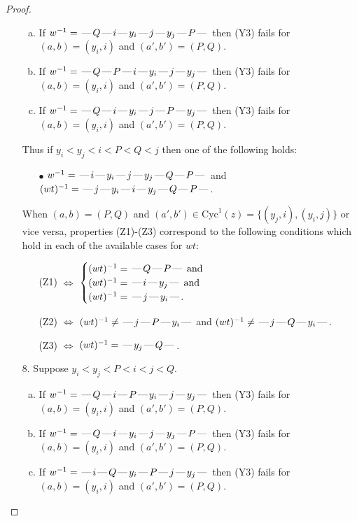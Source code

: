 \documentclass[10pt]{article}
\theoremstyle{definition}
\theoremstyle{definition}
\def\dash{\text{\hspace{0.5mm}---\hspace{0.5mm}}}
\def\Cyc{\mathrm{Cyc}}
\begin{document}
\begin{proof}
\begin{enumerate}
\begin{enumerate}[(a)]
\item If $w^{-1} = \dash Q\dash i\dash y_i\dash j\dash y_j\dash P\dash $ then (Y3) fails for $(a,b)=(y_i,i)$ and $(a',b')=(P,Q)$.
\item If $w^{-1} = \dash Q\dash P\dash i\dash y_i\dash j\dash y_j\dash $ then (Y3) fails for $(a,b)=(y_i,i)$ and $(a',b')=(P,Q)$.
\item If $w^{-1} = \dash Q\dash i\dash y_i\dash j\dash P\dash y_j\dash $ then (Y3) fails for $(a,b)=(y_i,i)$ and $(a',b')=(P,Q)$.
\end{enumerate}
Thus if $y_i < y_j < i < P < Q < j$ then one of the following holds:
\begin{enumerate}
\item[$\bullet$] $w^{-1} = \dash i\dash y_i\dash j\dash y_j\dash Q\dash P\dash $ and $(wt)^{-1} = \dash j\dash y_i\dash i\dash y_j\dash Q\dash P\dash $.
\end{enumerate}
When $(a,b)= (P,Q)$ and $(a',b')\in \Cyc^1(z)=\{(y_j,i),(y_i,j)\}$ or vice versa,
properties (Z1)-(Z3) correspond to the following conditions which
hold in each of the available cases for $wt$:
\begin{enumerate}
\item[](Z1) $\Leftrightarrow$ $\begin{cases}\text{$(wt)^{-1} = \dash Q \dash P \dash$}\text{ and }\\
\text{$(wt)^{-1} = \dash i \dash y_j \dash$}\text{ and }\\
\text{$(wt)^{-1} = \dash j \dash y_i \dash$}.\end{cases}$
\item[](Z2) $\Leftrightarrow$ $(wt)^{-1} \neq \dash j \dash P \dash y_i \dash$ and $(wt)^{-1}\neq \dash j \dash Q \dash y_i \dash$.
\item[](Z3) $\Leftrightarrow$ $(wt)^{-1} = \dash y_j \dash Q \dash$.
\end{enumerate}
\item[$8$.] Suppose $y_i < y_j < P < i < j < Q$.
\begin{enumerate}[(a)]
\item If $w^{-1} = \dash Q\dash i\dash P\dash y_i\dash j\dash y_j\dash $ then (Y3) fails for $(a,b)=(y_i,i)$ and $(a',b')=(P,Q)$.
\item If $w^{-1} = \dash Q\dash i\dash y_i\dash j\dash y_j\dash P\dash $ then (Y3) fails for $(a,b)=(y_i,i)$ and $(a',b')=(P,Q)$.
\item If $w^{-1} = \dash i\dash Q\dash y_i\dash P\dash j\dash y_j\dash $ then (Y3) fails for $(a,b)=(y_i,i)$ and $(a',b')=(P,Q)$.

\end{enumerate}
\end{enumerate}
\end{proof}
\end{document}
